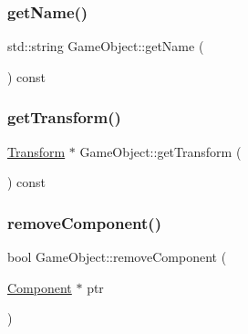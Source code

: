 \hypertarget{class_mason_1_1_game_object_a7b5b5ca6b3754cdfb175cd1938c77f10}{}\label{class_mason_1_1_game_object_a7b5b5ca6b3754cdfb175cd1938c77f10} 
\subsubsection{\texorpdfstring{get\+Name()}{getName()}}
{\footnotesize\ttfamily std\+::string Game\+Object\+::get\+Name (\begin{DoxyParamCaption}{ }\end{DoxyParamCaption}) const}

\hypertarget{class_mason_1_1_game_object_a162ad1209ccc3708009ce6166021572f}{}\label{class_mason_1_1_game_object_a162ad1209ccc3708009ce6166021572f} 
\subsubsection{\texorpdfstring{get\+Transform()}{getTransform()}}
{\footnotesize\ttfamily \hyperlink{class_mason_1_1_transform}{Transform} $\ast$ Game\+Object\+::get\+Transform (\begin{DoxyParamCaption}{ }\end{DoxyParamCaption}) const}

\hypertarget{class_mason_1_1_game_object_a1c030bb5020968009a9b6c85ac0b4df8}{}\label{class_mason_1_1_game_object_a1c030bb5020968009a9b6c85ac0b4df8} 
\subsubsection{\texorpdfstring{remove\+Component()}{removeComponent()}}
{\footnotesize\ttfamily bool Game\+Object\+::remove\+Component (\begin{DoxyParamCaption}\item[{\hyperlink{class_mason_1_1_component}{Component} $\ast$}]{ptr }\end{DoxyParamCaption})}

\hypertarget{class_mason_1_1_game_object_af478034e4602956fc936ee4fbe05d107}{}\label{class_mason_1_1_game_object_af478034e4602956fc936ee4fbe05d107} 
